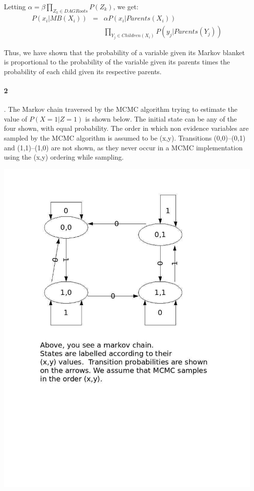 \documentclass[10pt]{article}
\begin{document}
Letting $\alpha = \beta\prod_{Z_{k}\in DAGRoots}P(Z_{k})$, we get:
\begin{eqnarray}
P(x_{i}|MB(X_{i})) & = &\alpha P(x_{i}|Parents(X_{i})) \nonumber \\
& & \prod_{Y_{j}\in Children(X_{i})} P(y_{j}|Parents(Y_{j}))
\end{eqnarray}

Thus, we have shown that the probability of a variable given its Markov blanket is proportional to the probability of the variable given its parents times the probability of each child given its respective parents.

   \paragraph{2}. The Markov chain traversed by the MCMC algorithm trying to estimate the value of $P(X=1|Z=1)$ is shown below. The initial state can be any of the four shown, with equal probability. The order in which non evidence variables are sampled by the MCMC algorithm is assumed to be (x,y). Transitions (0,0)--(0,1) and (1,1)--(1,0) are not shown, as they never occur in a MCMC implementation using the (x,y) ordering while sampling.
\begin{center}
 \includegraphics[scale=0.3]{markovChain.jpg}
\end{center}
\end{document}
